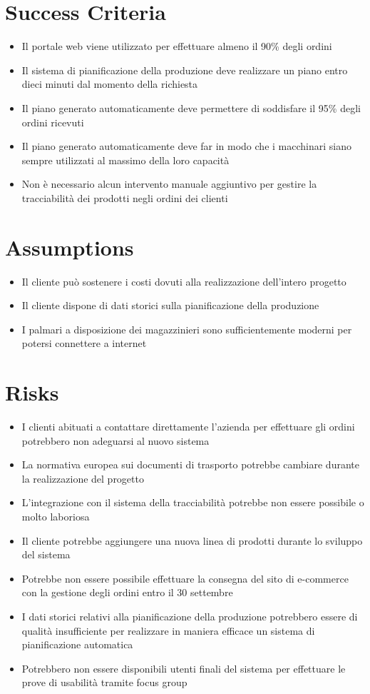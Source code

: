 \section{Success Criteria}
\begin{itemize}
  \item Il portale web viene utilizzato per effettuare almeno il 90\% degli ordini
  \item Il sistema di pianificazione della produzione deve realizzare un piano entro dieci minuti dal momento della richiesta
  \item Il piano generato automaticamente deve permettere di soddisfare il 95\% degli ordini ricevuti
  \item Il piano generato automaticamente deve far in modo che i macchinari siano sempre utilizzati al massimo della loro capacità
  \item Non è necessario alcun intervento manuale aggiuntivo per gestire la tracciabilità dei prodotti negli ordini dei clienti
\end{itemize}

\section{Assumptions}
\begin{itemize}
  \item Il cliente può sostenere i costi dovuti alla realizzazione dell'intero progetto
  \item Il cliente dispone di dati storici sulla pianificazione della produzione
  \item I palmari a disposizione dei magazzinieri sono sufficientemente moderni per potersi connettere a internet
\end{itemize}

\section{Risks}
\begin{itemize}
  \item I clienti abituati a contattare direttamente l'azienda per effettuare gli ordini potrebbero non adeguarsi al nuovo sistema
  \item La normativa europea sui documenti di trasporto potrebbe cambiare durante la realizzazione del progetto
  \item L'integrazione con il sistema della tracciabilità potrebbe non essere possibile o molto laboriosa
  \item Il cliente potrebbe aggiungere una nuova linea di prodotti durante lo sviluppo del sistema
  \item Potrebbe non essere possibile effettuare la consegna del sito di e-commerce con la gestione degli ordini entro il 30 settembre
  \item I dati storici relativi alla pianificazione della produzione potrebbero essere di qualità insufficiente per realizzare in maniera efficace un sistema di pianificazione automatica
  \item Potrebbero non essere disponibili utenti finali del sistema per effettuare le prove di usabilità tramite focus group
\end{itemize}

